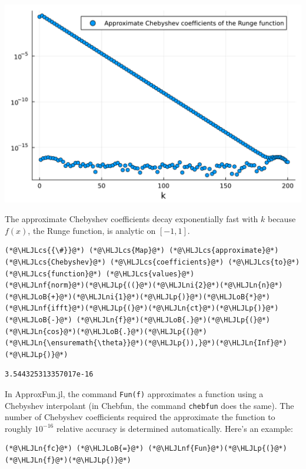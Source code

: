 \documentclass[12pt,a4paper]{article}
\newcommand{\HLJLn}[1]{#1}
\newcommand{\HLJLnf}[1]{\textcolor[RGB]{66,102,213}{#1}}
\newcommand{\HLJLni}[1]{\textcolor[RGB]{59,151,46}{#1}}
\newcommand{\HLJLoB}[1]{\textcolor[RGB]{102,102,102}{\textbf{#1}}}
\newcommand{\HLJLp}[1]{#1}
\newcommand{\HLJLcs}[1]{\textcolor[RGB]{153,153,119}{\textit{#1}}}
\begin{document}
\includegraphics[width=\linewidth]{jl_P71Faz/Chapter3_6_1.pdf}

The approximate Chebyshev coefficients decay exponentially fast with $k$ because $f(x)$, the Runge function, is analytic on $[-1, 1]$.


\begin{lstlisting}
(*@\HLJLcs{{\#}}@*) (*@\HLJLcs{Map}@*) (*@\HLJLcs{approximate}@*) (*@\HLJLcs{Chebyshev}@*) (*@\HLJLcs{coefficients}@*) (*@\HLJLcs{to}@*) (*@\HLJLcs{function}@*) (*@\HLJLcs{values}@*)
(*@\HLJLnf{norm}@*)(*@\HLJLp{((}@*)(*@\HLJLni{2}@*)(*@\HLJLn{n}@*)(*@\HLJLoB{+}@*)(*@\HLJLni{1}@*)(*@\HLJLp{)}@*)(*@\HLJLoB{*}@*)(*@\HLJLnf{ifft}@*)(*@\HLJLp{(}@*)(*@\HLJLn{ct}@*)(*@\HLJLp{)}@*) (*@\HLJLoB{-}@*) (*@\HLJLn{f}@*)(*@\HLJLoB{.}@*)(*@\HLJLp{(}@*)(*@\HLJLn{cos}@*)(*@\HLJLoB{.}@*)(*@\HLJLp{(}@*)(*@\HLJLn{\ensuremath{\theta}}@*)(*@\HLJLp{)),}@*)(*@\HLJLn{Inf}@*)(*@\HLJLp{)}@*)
\end{lstlisting}

\begin{lstlisting}
3.544325313357017e-16
\end{lstlisting}


In ApproxFun.jl, the command \texttt{Fun(f)} approximates a function using a Chebyshev interpolant (in Chebfun, the command \texttt{chebfun} does the same).  The number of Chebyshev coefficients required the approximate the function to roughly $10^{-16}$ relative accuracy is determined automatically. Here's an example:


\begin{lstlisting}
(*@\HLJLn{fc}@*) (*@\HLJLoB{=}@*) (*@\HLJLnf{Fun}@*)(*@\HLJLp{(}@*)(*@\HLJLn{f}@*)(*@\HLJLp{)}@*)
\end{lstlisting}
\end{document}
